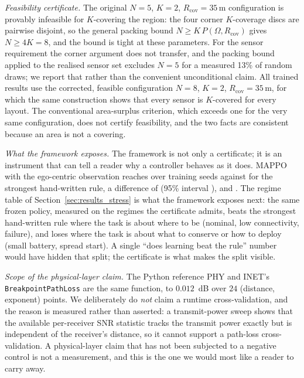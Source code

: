 \documentclass[conference]{IEEEtran}
\newcommand{\tokPhyDelta}{0.012}
\newcommand{\tokPhyRows}{24}
\begin{document}
\emph{Feasibility certificate.} The original $N=5$, $K=2$, $R_{\mathrm{cov}}=35$\,m configuration is provably infeasible for $K$-covering the region: the four corner $K$-coverage discs are pairwise disjoint, so the general packing bound $N\ge K\,P(\Omega,R_{\mathrm{cov}})$ gives $N\ge 4K=8$, and the bound is tight at these parameters. For the sensor requirement the corner argument does not transfer, and the packing bound applied to the realised sensor set excludes $N=5$ for a measured 13\% of random draws; we report that rather than the convenient unconditional claim. All trained results use the corrected, feasible configuration $N=8$, $K=2$, $R_{\mathrm{cov}}=35$\,m, for which the same construction shows that every sensor is $K$-covered for every layout. The conventional area-surplus criterion, which exceeds one for the very same configuration, does not certify feasibility, and the two facts are consistent because an area is not a covering.

\emph{What the framework exposes.} The framework is not only a certificate; it is an instrument that can tell a reader why a controller behaves as it does. MAPPO with the ego-centric observation reaches \tokEgoShapeCK{} over \tokEgoShapeN{} training seeds against \tokRuleReactiveLocalCK{} for the strongest hand-written rule, a difference of \tokLearnerMinusRule{} (95\% interval \tokLearnerMinusRuleCi), and \tokGapVerdict.  The regime table of Section~\ref{sec:results_stress} is what the framework exposes next: the same frozen policy, measured on the regimes the certificate admits, beats the strongest hand-written rule where the task is about where to be (nominal, low connectivity, failure), and loses where the task is about what to conserve or how to deploy (small battery, spread start).  A single ``does learning beat the rule'' number would have hidden that split; the certificate is what makes the split visible.

\emph{Scope of the physical-layer claim.} The Python reference PHY and INET's \texttt{BreakpointPathLoss} are the same function, to $\tokPhyDelta$~dB over $\tokPhyRows$ (distance, exponent) points. We deliberately do \emph{not} claim a runtime cross-validation, and the reason is measured rather than asserted: a transmit-power sweep shows that the available per-receiver SNR statistic tracks the transmit power exactly but is independent of the receiver's distance, so it cannot support a path-loss cross-validation. A physical-layer claim that has not been subjected to a negative control is not a measurement, and this is the one we would most like a reader to carry away.
\end{document}
